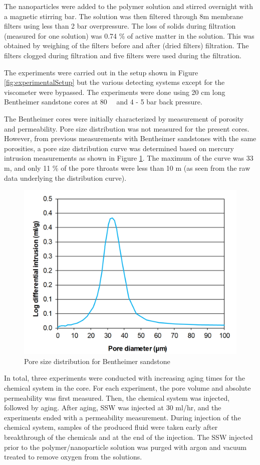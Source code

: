 The nanoparticles were added to the polymer solution and stirred overnight with a magnetic stirring bar. The solution was then filtered through 8\micro m membrane filters using less than 2 bar overpressure. The loss of solids during filtration (measured for one solution) was 0.74 \% of active matter in the solution. This was obtained by weighing of the filters before and after (dried filters) filtration. The filters clogged during filtration and five filters were used during the filtration.

The experiments were carried out in the setup shown in Figure \ref{fig:experimentalSetup} but the various detecting systems except for the viscometer were bypassed. The experiments were done using 20 cm long Bentheimer sandstone cores at 80~\celsius~ and 4 - 5 bar back pressure.

The Bentheimer cores were initially characterized by measurement of porosity and permeability. Pore size distribution was not measured for the present cores. However, from previous measurements with Bentheimer sandstones with the same porosities, a pore size distribution curve was determined based on mercury intrusion measurements as shown in Figure \ref{cht:poreSizeDist}. The maximum of the curve was 33 \micro m, and only 11 \% of the pore throats were less than 10 \micro m (as seen from the raw data underlying the distribution curve).

\begin{figure}
    \centering
    \includegraphics[width=.7\textwidth]{img/cht/poreSizeDist.png}
    \caption{Pore size distribution for Bentheimer sandstone}
    \label{cht:poreSizeDist}
\end{figure}

In total, three experiments were conducted with increasing aging times for the chemical system in the core. For each experiment, the pore volume and absolute permeability was first measured. Then, the chemical system was injected, followed by aging. After aging, SSW was injected at 30 ml/hr, and the experiments ended with a permeability measurement. During injection of the chemical system, samples of the produced fluid were taken early after breakthrough of the chemicals and at the end of the injection.
The SSW injected prior to the polymer/nanoparticle solution was purged with argon and vacuum treated to remove oxygen from the solutions.
